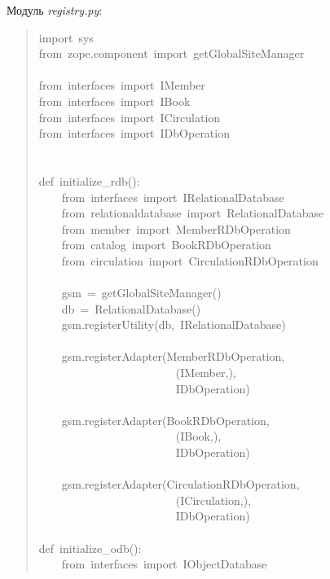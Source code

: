 \documentclass[14pt,a4paper,openany,twoside,final]{extbook}
\providecommand*{\DUroletitlereference}[1]{\textsl{#1}}
\begin{document}
Модуль \DUroletitlereference{registry.py}:

\begin{quote}{\ttfamily \raggedright \noindent
import~sys\\
from~zope.component~import~getGlobalSiteManager\\
~\\
from~interfaces~import~IMember\\
from~interfaces~import~IBook\\
from~interfaces~import~ICirculation\\
from~interfaces~import~IDbOperation\\
~\\
~\\
def~initialize\_rdb():\\
~~~~from~interfaces~import~IRelationalDatabase\\
~~~~from~relationaldatabase~import~RelationalDatabase\\
~~~~from~member~import~MemberRDbOperation\\
~~~~from~catalog~import~BookRDbOperation\\
~~~~from~circulation~import~CirculationRDbOperation\\
~\\
~~~~gsm~=~getGlobalSiteManager()\\
~~~~db~=~RelationalDatabase()\\
~~~~gsm.registerUtility(db,~IRelationalDatabase)\\
~\\
~~~~gsm.registerAdapter(MemberRDbOperation,\\
~~~~~~~~~~~~~~~~~~~~~~~~(IMember,),\\
~~~~~~~~~~~~~~~~~~~~~~~~IDbOperation)\\
~\\
~~~~gsm.registerAdapter(BookRDbOperation,\\
~~~~~~~~~~~~~~~~~~~~~~~~(IBook,),\\
~~~~~~~~~~~~~~~~~~~~~~~~IDbOperation)\\
~\\
~~~~gsm.registerAdapter(CirculationRDbOperation,\\
~~~~~~~~~~~~~~~~~~~~~~~~(ICirculation,),\\
~~~~~~~~~~~~~~~~~~~~~~~~IDbOperation)\\
~\\
def~initialize\_odb():\\
~~~~from~interfaces~import~IObjectDatabase\\
}
\end{quote}
\end{document}
